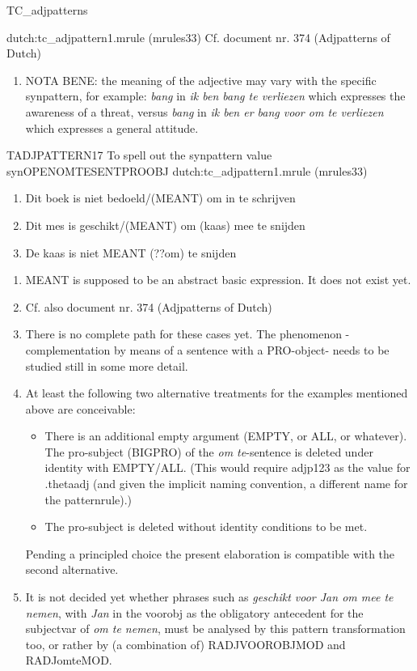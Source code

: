 \begin{mruleclass}{TC\_adjpatterns}
\begin{members}
\begin{member}
\file dutch:tc\_adjpattern1.mrule (mrules33)
\semantics \nosemantics
\example Cf. document nr. 374 (Adjpatterns of Dutch)
\remarks\mbox{}
\begin{enumerate}
\item NOTA BENE: the meaning of the adjective may  vary with the specific 
synpattern, for example: {\em bang} in {\em ik ben bang te verliezen}
which expresses the awareness of a threat, 
versus  {\em bang} in {\em ik ben er bang voor om te verliezen} 
which expresses a general attitude.
\\

\end{enumerate}

\end{member}
\begin{member}
 TADJPATTERN17
 To spell out the synpattern value synOPENOMTESENTPROOBJ
\file dutch:tc\_adjpattern1.mrule (mrules33)
\semantics \nosemantics
\example\mbox{}\\
\begin{enumerate}
  \item 
Dit boek is niet bedoeld/(MEANT) om in te schrijven
  \item 
Dit mes is geschikt/(MEANT) om (kaas) mee te snijden
  \item 
De kaas is niet MEANT (??om) te snijden
\end{enumerate}
\remarks\mbox{}

\begin{enumerate}
\item MEANT is supposed to be an abstract basic expression. It does not exist 
yet. 
\item Cf. also  document nr. 374 (Adjpatterns of Dutch)
\item There is no complete path for these cases yet. 
The phenomenon - complementation by means of a sentence with a PRO-object- 
needs to be 
studied still in some more detail. 
\item 
At least the following 
two alternative treatments for the examples mentioned above are 
conceivable:
\begin{itemize}
  \item There is an additional empty argument (EMPTY,  or ALL, or whatever).
The pro-subject (BIGPRO) of the {\em om te}-sentence is deleted 
under identity with EMPTY/ALL. 
(This would require adjp123 as the value for .thetaadj (and given the implicit 
naming convention, a different name for the patternrule).) 
  \item
The pro-subject is deleted without identity conditions to be met.
\end{itemize}
Pending a principled choice the present elaboration is compatible 
with the second alternative.
\item It is not decided yet whether phrases such as 
{\em geschikt voor Jan om mee te nemen}, with {\em Jan} in the voorobj
as the obligatory antecedent for the 
subjectvar of {\em om te nemen}, 
must be  analysed by this 
pattern transformation too,  or rather by (a combination of) 
RADJVOOROBJMOD and  RADJomteMOD.


\end{enumerate}
\end{member}
\end{members}
\end{mruleclass}
